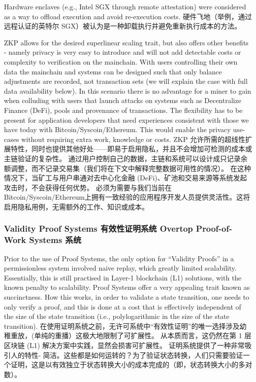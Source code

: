 \documentclass{ctexart}
\begin{document}
Hardware enclaves (e.g., Intel SGX through remote attestation) were considered as a way to offload execution and avoid re-execution costs. 硬件飞地（举例，通过远程认证的英特尔 SGX）被认为是一种卸载执行并避免重新执行成本的方法。

ZKP allows for the desired superlinear scaling trait, but also offers other benefits - namely privacy is very easy to introduce and will not add detectable costs or complexity to verification on the mainchain. With users controlling their own data the mainchain and systems can be designed such that only balance adjustments are recorded, not transaction sets (we will explain the case with full data availability below). In this scenario there is no advantage for a miner to gain when colluding with users that launch attacks on systems such as Decentralize Finance (DeFi), pools and provenance of transactions. The flexibility has to be present for application developers that need experiences consistent with those we have today with Bitcoin/Syscoin/Ethereum. This would enable the privacy use-cases without requiring extra work, knowledge or costs. ZKP 允许所需的超线性扩展特性，同时也提供其他好处——即易于启用隐私，并且不会增加可检测的成本或主链验证的复杂性。 通过用户控制自己的数据，主链和系统可以设计成只记录余额调整，而不记录交易集（我们将在下文中解释完整数据可用性的情况）。 在这种情况下，当矿工与用户串通对去中心化金融 (DeFi)、矿池和交易来源等系统发起攻击时，不会获得任何优势。 必须为需要与我们当前在Bitcoin/Syscoin/Ethereum上拥有一致经验的应用程序开发人员提供灵活性。这将启用隐私用例，无需额外的工作、知识或成本。

\subsubsection{Validity Proof Systems 有效性证明系统 Overtop Proof-of-Work Systems 系统}

Prior to the use of Proof Systems, the only option for “Validity Proofs” in a permissionless system involved naive replay, which greatly limited scalability. Essentially, this is still practised in Layer-1 blockchain (L1) solutions, with the known penalty to scalability. Proof Systems offer a very appealing trait known as succinctness. How this works, in order to validate a state transition, one needs to only verify a proof, and this is done at a cost that is effectively independent of the size of the state transition (i.e., polylogarithmic in the size of the state transition). 在使用证明系统之前，无许可系统中“有效性证明”的唯一选择涉及幼稚重放，(单纯的重播）这极大地限制了可扩展性。 从本质而言，这仍然在第 1 层区块链 (L1) 解决方案中实践，显然会损害可扩展性。 证明系统提供了一种非常吸引人的特性- 简洁。这些都是如何运转的？为了验证状态转换，人们只需要验证一个证明，这是以有效独立于状态转换大小的成本完成的（即，状态转换大小的多对数）。
\end{document}
